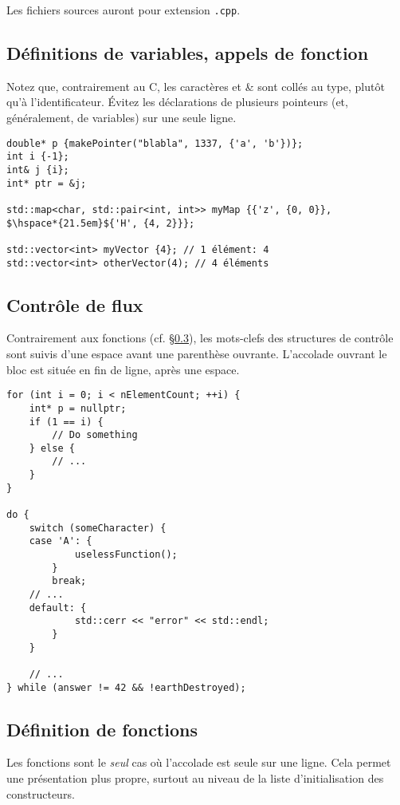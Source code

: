\documentclass[12pt,a4paper]{article}
\begin{document}
Les fichiers sources auront pour extension \texttt{.cpp}.

\subsection{Définitions de variables, appels de fonction}
Notez que, contrairement au C, les caractères \og * \fg{} et \og \& \fg{} sont collés au type, plutôt qu'à l'identificateur. Évitez les déclarations de plusieurs pointeurs (et, généralement, de variables) sur une seule ligne.

\begin{verbatim}
double* p {makePointer("blabla", 1337, {'a', 'b'})};
int i {-1};
int& j {i};
int* ptr = &j;

std::map<char, std::pair<int, int>> myMap {{'z', {0, 0}},
$\hspace*{21.5em}${'H', {4, 2}}};

std::vector<int> myVector {4}; // 1 élément: 4
std::vector<int> otherVector(4); // 4 éléments
\end{verbatim}

\subsection{Contrôle de flux}

Contrairement aux fonctions (cf. §\ref{sec:fct}), les mots-clefs des structures de contrôle sont suivis d'une espace avant une parenthèse ouvrante. L'accolade ouvrant le bloc est située en fin de ligne, après une espace.

\begin{verbatim}
for (int i = 0; i < nElementCount; ++i) {
	int* p = nullptr;
	if (1 == i) {
		// Do something
	} else {
		// ...
	}
}

do {
	switch (someCharacter) {
	case 'A': {
			uselessFunction();
		}
		break;
	// ...
	default: {
			std::cerr << "error" << std::endl;
		}
	}

	// ...
} while (answer != 42 && !earthDestroyed);
\end{verbatim}

\subsection{Définition de fonctions}
\label{sec:fct}

Les fonctions sont le \emph{seul} cas où l'accolade est seule sur une ligne. Cela permet une présentation plus propre, surtout au niveau de la liste d'initialisation des constructeurs.
\end{document}
